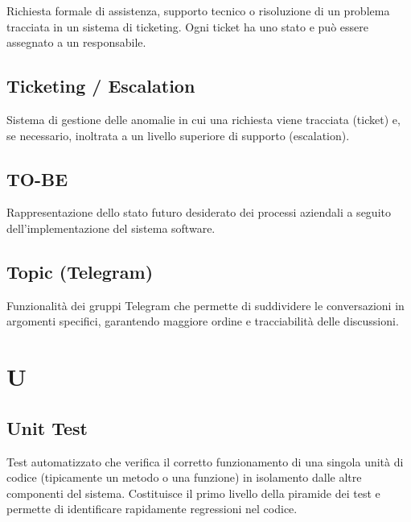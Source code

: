\documentclass[a4paper, 11pt, oneside]{scrartcl} %
\begin{document}

Richiesta formale di assistenza, supporto tecnico o risoluzione di un problema tracciata in un sistema di ticketing. Ogni ticket ha uno stato e può essere assegnato a un responsabile.

\vspace{0.5cm}

\subsection*{Ticketing / Escalation}
Sistema di gestione delle anomalie in cui una richiesta viene tracciata (ticket) e, se necessario, inoltrata a un livello superiore di supporto (escalation).
\vspace{0.5cm}

\subsection*{TO-BE}
Rappresentazione dello stato futuro desiderato dei processi aziendali a seguito dell'implementazione del sistema software.
\vspace{0.5cm}

\subsection*{Topic (Telegram)}


Funzionalità dei gruppi Telegram che permette di suddividere le conversazioni in argomenti specifici, garantendo maggiore ordine e tracciabilità delle discussioni.

\vspace{0.5cm}



\section*{U}


\subsection*{Unit Test}
Test automatizzato che verifica il corretto funzionamento di una singola unità di codice (tipicamente un metodo o una funzione) in isolamento dalle altre componenti del sistema. Costituisce il primo livello della piramide dei test e permette di identificare rapidamente regressioni nel codice.
\vspace{0.5cm}
\end{document}
